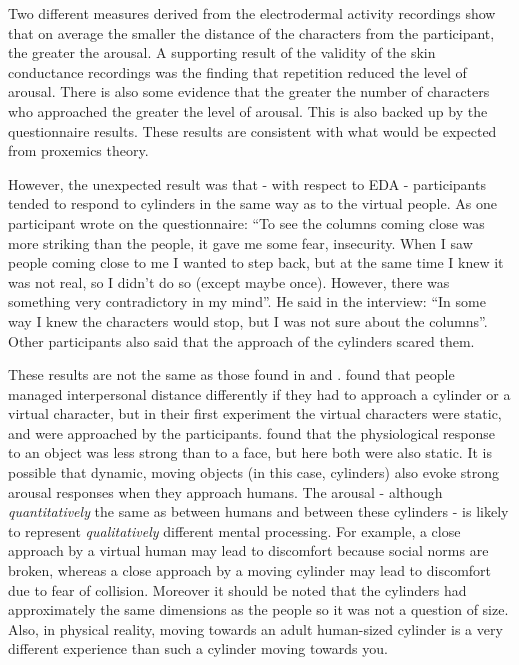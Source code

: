 \documentclass[
		twoside,openright,titlepage,numbers=noenddot,manychapters,
		headinclude,%
                footinclude=false,cleardoublepage=empty,
                BCOR=5mm,
		fontsize=11pt, %
                 enabledeprecatedfontcommands]{scrreprt}
\begin{document}
Two different measures derived from the electrodermal activity recordings show that on average the smaller the distance of the characters from the participant, the greater the arousal. A supporting result of the validity of the skin conductance recordings was the finding that repetition reduced the level of arousal. There is also some evidence that the greater the number of characters who approached the greater the level of arousal. This is also backed up by the questionnaire results. These results are consistent with what would be expected from proxemics theory.

However, the unexpected result was that - with respect to EDA - participants tended to respond to cylinders in the same way as to the virtual people. As one participant wrote on the questionnaire: ``To see the columns coming close was more striking than the people, it gave me some fear, insecurity. When I saw people coming close to me I wanted to step back, but at the same time I knew it was not real, so I didn't do so (except maybe once). However, there was something very contradictory in my mind''. He said in the interview:  ``In some way I knew the characters would stop, but I was not sure about the columns''. Other participants also said that the approach of the cylinders scared them. 

These results are not the same as those found in \cite[]{bailenson2001etr} and \cite[]{wilcox2006personal}. \cite{bailenson2001etr} found that people managed interpersonal distance differently if they had to approach a cylinder or a virtual character, but in their first experiment the virtual characters were static, and were approached by the participants. \cite{wilcox2006personal} found that the physiological response to an object was less strong than to a face, but here both were also static. It is possible that dynamic, moving objects (in this case, cylinders) also evoke strong arousal responses when they approach humans. The arousal - although \emph{quantitatively} the same as between humans and between these cylinders - is likely to represent \emph{qualitatively} different mental processing. For example, a close approach by a virtual human may lead to discomfort because social norms are broken, whereas a close approach by a moving cylinder may lead to discomfort due to fear of collision. Moreover it should be noted that the cylinders had approximately the same dimensions as the people so it was not a question of size. Also, in physical reality, moving towards an adult human-sized cylinder is a very different experience than such a cylinder moving towards you.
\end{document}
